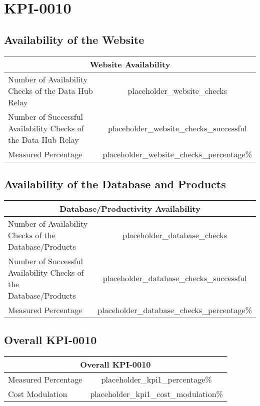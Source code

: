 \documentclass{article}
\begin{document}
\section{KPI-0010}

\subsection{Availability of the Website}

\begin{table}[H]
\centering
\begin{tabular}{|l|c|}
\hline
\multicolumn{2}{|c|}{\textbf{Website Availability}}                    \\ \hline
Number of Availability Checks of the Data Hub Relay & placeholder_website_checks \\ \hline
Number of Successful Availability Checks of the Data Hub Relay & placeholder_website_checks_successful \\ \hline
Measured Percentage & placeholder_website_checks_percentage\% \\ \hline
\end{tabular}
\end{table}

\subsection{Availability of the Database and Products}

\begin{table}[H]
\centering
\begin{tabular}{|l|c|}
\hline
\multicolumn{2}{|c|}{\textbf{Database/Productivity Availability}} \\ \hline
Number of Availability Checks of the Database/Products & placeholder_database_checks \\ \hline
Number of Successful Availability Checks of the Database/Products & placeholder_database_checks_successful \\ \hline
Measured Percentage & placeholder_database_checks_percentage\% \\ \hline
\end{tabular}
\end{table}

\subsection{Overall KPI-0010}

\begin{table}[H]
\centering
\begin{tabular}{|l|c|}
\hline
\multicolumn{2}{|c|}{\textbf{Overall KPI-0010}} \\ \hline
Measured Percentage & placeholder_kpi1_percentage\% \\ \hline
Cost Modulation & placeholder_kpi1_cost_modulation\% \\ \hline
\end{tabular}
\end{table}
\end{document}
